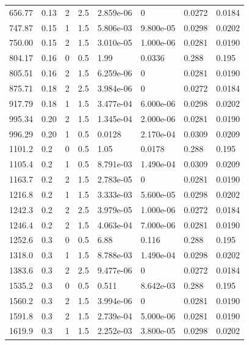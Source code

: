 \documentclass[preview]{standalone}
\begin{document}
{{\begin{tabular}{L{1.2cm}C{1.2cm} C{0.3cm}C{0.5cm} C{1.4cm}C{1.4cm} C{1.4cm}C{1.4cm}}
  656.77  &  0.13  & 2     & 2.5 &  2.859e-06  & 0  & 0.0272 &  0.0184   \\ 
  747.87  &  0.15  & 1     & 1.5 &  5.806e-03  & 9.800e-05  & 0.0298 &  0.0202   \\ 
  750.00  &  0.15  & 2     & 1.5 &  3.010e-05  & 1.000e-06  & 0.0281 &  0.0190   \\ 
  804.17  &  0.16  & 0     & 0.5 &  1.99  & 0.0336  & 0.288 &  0.195   \\ 
  805.51  &  0.16  & 2     & 1.5 &  6.259e-06  & 0  & 0.0281 &  0.0190   \\ 
  875.71  &  0.18  & 2     & 2.5 &  3.984e-06  & 0  & 0.0272 &  0.0184   \\ 
  917.79  &  0.18  & 1     & 1.5 &  3.477e-04  & 6.000e-06  & 0.0298 &  0.0202   \\ 
  995.34  &  0.20  & 2     & 1.5 &  1.345e-04  & 2.000e-06  & 0.0281 &  0.0190   \\ 
  996.29  &  0.20  & 1     & 0.5 &  0.0128  & 2.170e-04  & 0.0309 &  0.0209   \\ 
  1101.2  &   0.2  & 0     & 0.5 &  1.05  & 0.0178  & 0.288 &  0.195   \\ 
  1105.4  &   0.2  & 1     & 0.5 &  8.791e-03  & 1.490e-04  & 0.0309 &  0.0209   \\ 
  1163.7  &   0.2  & 2     & 1.5 &  2.783e-05  & 0  & 0.0281 &  0.0190   \\ 
  1216.8  &   0.2  & 1     & 1.5 &  3.333e-03  & 5.600e-05  & 0.0298 &  0.0202   \\ 
  1242.3  &   0.2  & 2     & 2.5 &  3.979e-05  & 1.000e-06  & 0.0272 &  0.0184   \\ 
  1246.4  &   0.2  & 2     & 1.5 &  4.063e-04  & 7.000e-06  & 0.0281 &  0.0190   \\ 
  1252.6  &   0.3  & 0     & 0.5 &  6.88  & 0.116  & 0.288 &  0.195   \\ 
  1318.0  &   0.3  & 1     & 1.5 &  8.788e-03  & 1.490e-04  & 0.0298 &  0.0202   \\ 
  1383.6  &   0.3  & 2     & 2.5 &  9.477e-06  & 0  & 0.0272 &  0.0184   \\ 
  1535.2  &   0.3  & 0     & 0.5 &  0.511  & 8.642e-03  & 0.288 &  0.195   \\ 
  1560.2  &   0.3  & 2     & 1.5 &  3.994e-06  & 0  & 0.0281 &  0.0190   \\ 
  1591.8  &   0.3  & 2     & 1.5 &  2.739e-04  & 5.000e-06  & 0.0281 &  0.0190   \\ 
  1619.9  &   0.3  & 1     & 1.5 &  2.252e-03  & 3.800e-05  & 0.0298 &  0.0202   \\ 

\end{tabular}}}
\end{document}
